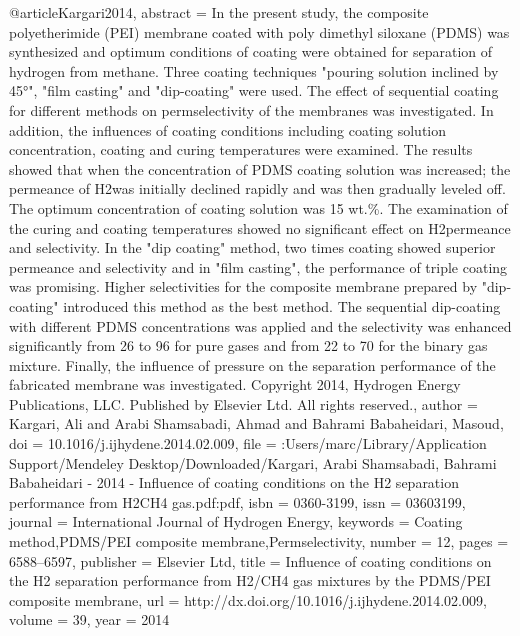 @article{Kargari2014,
abstract = {In the present study, the composite polyetherimide (PEI) membrane coated with poly dimethyl siloxane (PDMS) was synthesized and optimum conditions of coating were obtained for separation of hydrogen from methane. Three coating techniques "pouring solution inclined by 45°", "film casting" and "dip-coating" were used. The effect of sequential coating for different methods on permselectivity of the membranes was investigated. In addition, the influences of coating conditions including coating solution concentration, coating and curing temperatures were examined. The results showed that when the concentration of PDMS coating solution was increased; the permeance of H2was initially declined rapidly and was then gradually leveled off. The optimum concentration of coating solution was 15 wt.{\%}. The examination of the curing and coating temperatures showed no significant effect on H2permeance and selectivity. In the "dip coating" method, two times coating showed superior permeance and selectivity and in "film casting", the performance of triple coating was promising. Higher selectivities for the composite membrane prepared by "dip-coating" introduced this method as the best method. The sequential dip-coating with different PDMS concentrations was applied and the selectivity was enhanced significantly from 26 to 96 for pure gases and from 22 to 70 for the binary gas mixture. Finally, the influence of pressure on the separation performance of the fabricated membrane was investigated. Copyright {\textcopyright} 2014, Hydrogen Energy Publications, LLC. Published by Elsevier Ltd. All rights reserved.},
author = {Kargari, Ali and {Arabi Shamsabadi}, Ahmad and {Bahrami Babaheidari}, Masoud},
doi = {10.1016/j.ijhydene.2014.02.009},
file = {:Users/marc/Library/Application Support/Mendeley Desktop/Downloaded/Kargari, Arabi Shamsabadi, Bahrami Babaheidari - 2014 - Influence of coating conditions on the H2 separation performance from H2CH4 gas.pdf:pdf},
isbn = {0360-3199},
issn = {03603199},
journal = {International Journal of Hydrogen Energy},
keywords = {Coating method,PDMS/PEI composite membrane,Permselectivity},
number = {12},
pages = {6588--6597},
publisher = {Elsevier Ltd},
title = {{Influence of coating conditions on the H2 separation performance from H2/CH4 gas mixtures by the PDMS/PEI composite membrane}},
url = {http://dx.doi.org/10.1016/j.ijhydene.2014.02.009},
volume = {39},
year = {2014}
}

